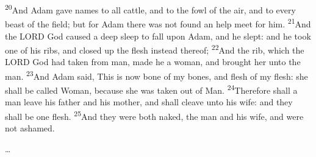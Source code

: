 \documentclass[10pt,oneside,a4paper]{memoir}
\renewcommand{\verse}[1]{\textsuperscript{#1}}
\begin{document}
\begin{paracol}{2}
\verse{20}And Adam gave names to all cattle, and to the fowl of the air, and to every beast of the field; but for Adam there was not found an help meet for him.  
\verse{21}And the LORD God caused a deep sleep to fall upon Adam, and he slept: and he took one of his ribs, and closed up the flesh instead thereof; 
\verse{22}And the rib, which the LORD God had taken from man, made he a woman, and brought her unto the man.  
\verse{23}And Adam said, This is now bone of my bones, and flesh of my flesh: she shall be called Woman, because she was taken out of Man.  
\verse{24}Therefore shall a man leave his father and his mother, and shall cleave unto his wife: and they shall be one flesh.  
\verse{25}And they were both naked, the man and his wife, and were not ashamed.  
\end{paracol}
\bigskip\ldots
\end{document}
